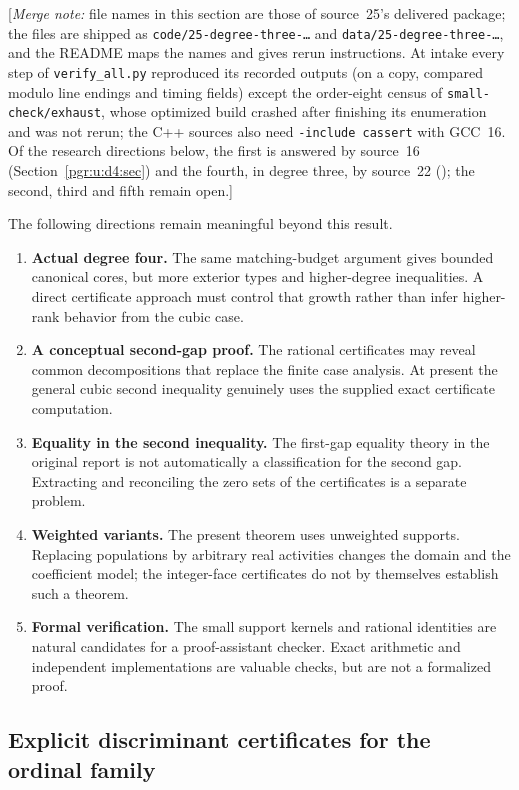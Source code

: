 \documentclass[11pt]{article}
\makeatletter
\numberwithin{equation}{section}
\theoremstyle{definition}\newtheorem{definition}[theorem]{Definition}\newtheorem{remark}[theorem]{Remark}
\newcommand{\mnote}[1]{[\textit{Merge note:} #1]}
\newcommand{\pgrfwd}[2]{\@ifundefined{r@#1}{#2}{\ref{#1}}}
\makeatother
\begin{document}
\mnote{file names in this section are those of source~25's delivered
package; the files are shipped as \texttt{code/25-degree-three-\dots} and
\texttt{data/25-degree-three-\dots}, and the README maps the names and
gives rerun instructions. At intake every step of \texttt{verify\_all.py}
reproduced its recorded outputs (on a copy, compared modulo line endings
and timing fields) except the order-eight census of
\texttt{small-check/exhaust}, whose optimized build crashed after finishing
its enumeration and was not rerun; the C++ sources also need
\texttt{-include cassert} with GCC~16. Of the research directions below,
the first is answered by source~16 (Section~\ref{pgr:u:d4:sec}) and the
fourth, in degree three, by source~22
(\pgrfwd{pgr:r:ir:sec}{Part~II}); the second, third and fifth remain
open.}

The following directions remain meaningful beyond this result.
\begin{enumerate}[itemsep=3pt]
\item \textbf{Actual degree four.} The same matching-budget argument gives bounded canonical cores, but more exterior types and higher-degree inequalities. A direct certificate approach must control that growth rather than infer higher-rank behavior from the cubic case.
\item \textbf{A conceptual second-gap proof.} The rational certificates may reveal common decompositions that replace the finite case analysis. At present the general cubic second inequality genuinely uses the supplied exact certificate computation.
\item \textbf{Equality in the second inequality.} The first-gap equality theory in the original report is not automatically a classification for the second gap. Extracting and reconciling the zero sets of the certificates is a separate problem.
\item \textbf{Weighted variants.} The present theorem uses unweighted supports. Replacing populations by arbitrary real activities changes the domain and the coefficient model; the integer-face certificates do not by themselves establish such a theorem.
\item \textbf{Formal verification.} The small support kernels and rational identities are natural candidates for a proof-assistant checker. Exact arithmetic and independent implementations are valuable checks, but are not a formalized proof.
\end{enumerate}


\subsection{Explicit discriminant certificates for the ordinal family}\label{pgr:u:d3:app:disc}
\end{document}
